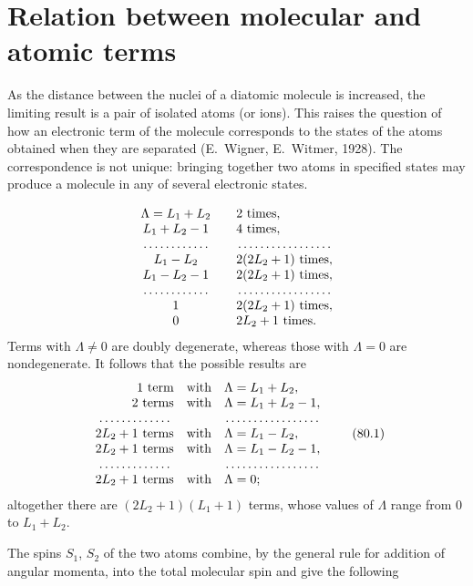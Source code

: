 \section{Relation between molecular and atomic terms}

As the distance between the nuclei of a diatomic molecule is increased, the limiting result is a pair of isolated atoms (or ions). This raises the question of how an electronic term of the molecule corresponds to the states of the atoms obtained when they are separated (E.~Wigner, E.~Witmer, 1928). The correspondence is not unique: bringing together two atoms in specified states may produce a molecule in any of several electronic states.


\[
\begin{array}{c@{\qquad}l}
\Lambda=L_1+L_2&2\text{ times},\\
L_1+L_2-1&4\text{ times},\\
\dotfill&\dotfill\\
L_1-L_2&2(2L_2+1)\text{ times},\\
L_1-L_2-1&2(2L_2+1)\text{ times},\\
\dotfill&\dotfill\\
1&2(2L_2+1)\text{ times},\\
0&2L_2+1\text{ times}.
\end{array}
\]
Terms with $\Lambda\ne0$ are doubly degenerate, whereas those with $\Lambda=0$ are nondegenerate. It follows that the possible results are
\begin{equation}
\begin{array}{r@{\quad}c@{\quad}l}
1\text{ term}&\text{with}&\Lambda=L_1+L_2,\\
2\text{ terms}&\text{with}&\Lambda=L_1+L_2-1,\\
\dotfill&&\dotfill\\
2L_2+1\text{ terms}&\text{with}&\Lambda=L_1-L_2,\\
2L_2+1\text{ terms}&\text{with}&\Lambda=L_1-L_2-1,\\
\dotfill&&\dotfill\\
2L_2+1\text{ terms}&\text{with}&\Lambda=0;
\end{array}
\tag{80.1}
\end{equation}
altogether there are $(2L_2+1)(L_1+1)$ terms, whose values of $\Lambda$ range from 0 to $L_1+L_2$.

The spins $S_1$, $S_2$ of the two atoms combine, by the general rule for addition of angular momenta, into the total molecular spin and give the following

